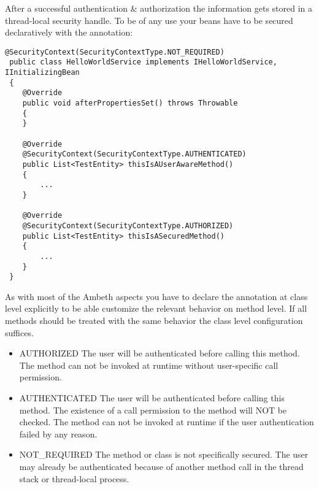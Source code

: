 After a successful authentication \& authorization the information gets stored in a thread-local security handle. To be of any use your beans have to be secured declaratively with the  annotation:

\begin{lstlisting}[style=Java]
@SecurityContext(SecurityContextType.NOT_REQUIRED)
 public class HelloWorldService implements IHelloWorldService, IInitializingBean
 {
 	@Override
 	public void afterPropertiesSet() throws Throwable
 	{
 	}
 
 	@Override
 	@SecurityContext(SecurityContextType.AUTHENTICATED)
 	public List<TestEntity> thisIsAUserAwareMethod()
 	{
 		...
 	}
 
 	@Override
 	@SecurityContext(SecurityContextType.AUTHORIZED)
 	public List<TestEntity> thisIsASecuredMethod()
 	{
 		...
 	}
 }
\end{lstlisting}
As with most of the Ambeth aspects you have to declare the annotation at class level explicitly to be able customize the relevant behavior on method level. If all methods should be treated with the same behavior the class level configuration suffices.

\begin{itemize}
	\item AUTHORIZED The user will be authenticated before calling this method. The method can not be invoked at runtime without user-specific call permission.
	\item AUTHENTICATED The user will be authenticated before calling this method. The existence of a call permission to the method will NOT be checked. The method can not be invoked at runtime if the user authentication failed by any reason.
	\item NOT\_REQUIRED The method or class is not specifically secured. The user may already be authenticated because of another method call in the thread stack or thread-local process.
\end{itemize}




